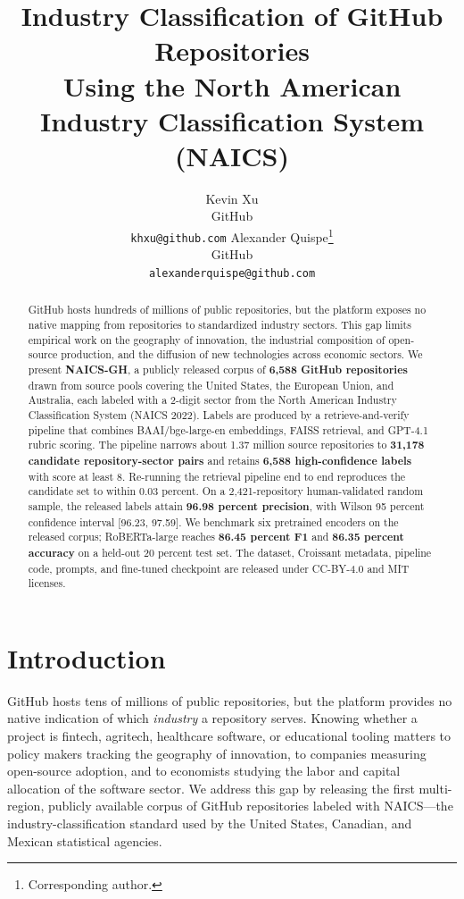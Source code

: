 \documentclass{article}
\title{Industry Classification of GitHub Repositories\\
Using the North American Industry Classification System (NAICS)}
\author{%
  Kevin Xu \\
  GitHub \\
  \texttt{khxu@github.com}
  \And
  Alexander Quispe\thanks{Corresponding author.} \\
  GitHub \\
  \texttt{alexanderquispe@github.com}
}
\date{}
\begin{document}
\maketitle

\begin{abstract}
GitHub hosts hundreds of millions of public repositories, but the
platform exposes no native mapping from repositories to standardized
industry sectors. This gap limits empirical work on the geography of
innovation, the industrial composition of open-source production, and
the diffusion of new technologies across economic sectors. We present
\textbf{NAICS-GH}, a publicly released corpus of \textbf{6{,}588 GitHub
repositories} drawn from source pools covering the United States, the
European Union, and Australia, each labeled with a 2-digit sector from
the North American Industry Classification System (NAICS 2022). Labels
are produced by a retrieve-and-verify pipeline that combines
BAAI/bge-large-en embeddings, FAISS retrieval, and GPT-4.1 rubric
scoring. The pipeline narrows about 1.37 million source repositories to
\textbf{31{,}178 candidate repository-sector pairs} and retains
\textbf{6{,}588 high-confidence labels} with score at least 8.
Re-running the retrieval pipeline end to end reproduces the candidate
set to within 0.03 percent. On a 2{,}421-repository human-validated
random sample, the released labels attain \textbf{96.98 percent
precision}, with Wilson 95 percent confidence interval [96.23, 97.59].
We benchmark six pretrained encoders on the released corpus;
RoBERTa-large reaches \textbf{86.45 percent F1} and \textbf{86.35
percent accuracy} on a held-out 20 percent test set. The dataset,
Croissant metadata, pipeline code, prompts, and fine-tuned checkpoint
are released under CC-BY-4.0 and MIT licenses.
\end{abstract}

\section{Introduction}
\label{sec:intro}

GitHub hosts tens of millions of public repositories, but the platform
provides no native indication of which \emph{industry} a repository
serves. Knowing whether a project is fintech, agritech, healthcare
software, or educational tooling matters to policy makers tracking the
geography of innovation, to companies measuring open-source adoption, and
to economists studying the labor and capital allocation of the software
sector. We address this gap by releasing the first multi-region,
publicly available corpus of GitHub repositories labeled with NAICS---the
industry-classification standard used by the United States, Canadian, and
Mexican statistical agencies.
\end{document}
